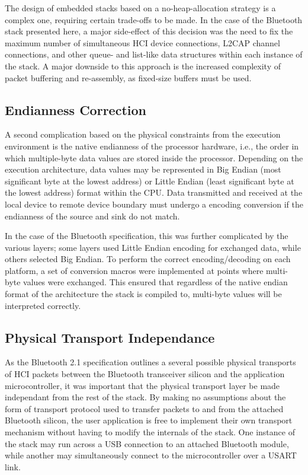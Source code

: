 The design of embedded stacks based on a no-heap-allocation strategy is a complex one, requiring certain trade-offs to be made. In the case of the Bluetooth stack presented here, a major side-effect of this decision was the need to fix the maximum number of simultaneous HCI device connections, L2CAP channel connections, and other queue- and list-like data structures within each instance of the stack. A major downside to this approach is the increased complexity of packet buffering and re-assembly, as fixed-size buffers must be used.

\FloatBarrier
\subsection{Endianness Correction}

A second complication based on the physical constraints from the execution environment is the native endianness of the processor hardware, i.e., the order in which multiple-byte data values are stored inside the processor. Depending on the execution architecture, data values may be represented in Big Endian (most significant byte at the lowest address) or Little Endian (least significant byte at the lowest address) format within the CPU. Data transmitted and received at the local device to remote device boundary must undergo a encoding conversion if the endianness of the source and sink do not match.

In the case of the Bluetooth specification, this was further complicated by the various layers; some layers used Little Endian encoding for exchanged data, while others selected Big Endian. To perform the correct encoding/decoding on each platform, a set of conversion macros were implemented at points where multi-byte values were exchanged. This ensured that regardless of the native endian format of the architecture the stack is compiled to, multi-byte values will be interpreted correctly.

\FloatBarrier
\subsection{Physical Transport Independance}

As the Bluetooth 2.1 specification outlines a several possible physical transports of HCI packets between the Bluetooth transceiver silicon and the application microcontroller, it was important that the physical transport layer be made independant from the rest of the stack. By making no assumptions about the form of transport protocol used to transfer packets to and from the attached Bluetooth silicon, the user application is free to implement their own transport mechanism without having to modify the internals of the stack. One instance of the stack may run across a USB connection to an attached Bluetooth module, while another may simultaneously connect to the microcontroller over a USART link.

